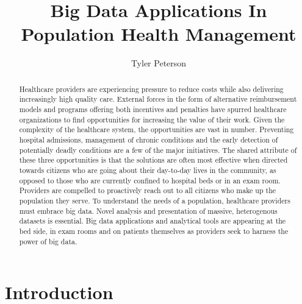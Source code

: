 \documentclass[sigconf]{acmart}
\begin{document}
\title{Big Data Applications In Population Health Management}


\author{Tyler Peterson}



\renewcommand{\shortauthors}{B. Trovato et al.}


\begin{abstract}

  Healthcare providers are experiencing pressure to reduce costs while also delivering increasingly high quality care. External forces in the form of alternative reimbursement models and programs offering both incentives and penalties have spurred healthcare organizations to find opportunities for increasing the value of their work. Given the complexity of the healthcare system, the opportunities are vast in number. Preventing hospital admissions, management of chronic conditions and the early detection of potentially deadly conditions are a few of the major initiatives. The shared attribute of these three opportunities is that the solutions are often most effective when directed towards citizens who are going about their day-to-day lives in the community, as opposed to those who are currently confined to hospital beds or in an exam room. Providers are compelled to proactively reach out to all citizens who make up the population they serve. To understand the needs of a population, healthcare providers must embrace big data. Novel analysis and presentation of massive, heterogenous datasets is essential. Big data applications and analytical tools are appearing at the bed side, in exam rooms and on patients themselves as providers seek to harness the power of big data.
  
\end{abstract}



\maketitle

\section{Introduction}
\end{document}
